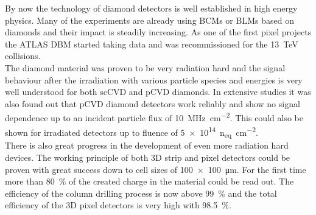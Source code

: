 By now the technology of diamond detectors is well established in high energy physics. Many of the experiments are already using \acp{BCM} or \acp{BLM} based on diamonds and their impact is steadily increasing. As one of the first pixel projects the ATLAS \ac{DBM} started taking data and was recommissioned for the \SI{13}{\tera\electronvolt} collisions.\\
The diamond material was proven to be very radiation hard and the signal behaviour after the irradiation with various particle species and energies is very well understood for both \ac{sc}\ac{CVD} and \ac{pCVD} diamonds. In extensive studies it was also found out that \ac{pCVD} diamond detectors work reliably and show no signal dependence up to an incident particle flux of \SI{10}{\mega\hertz\per\centi\meter^2}. This could also be shown for irradiated detectors up to fluence of \SI{5e14}{n_{eq}\per \centi\meter^2}.\\
There is also great progress in the development of even more radiation hard devices. The working principle of both 3D strip and pixel detectors could be proven with great success down to cell sizes of \SI{100x100}{\micro\meter}. For the first time more than \SI{80}{\%} of the created charge in the material could be read out. The efficiency of the column drilling process is now above \SI{99}{\%} and the total efficiency of the 3D pixel detectors is very high with \SI{98.5}{\%}.